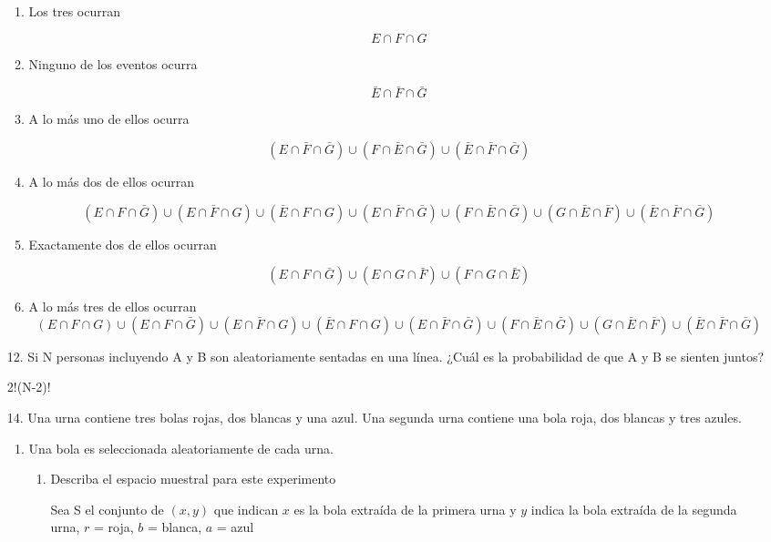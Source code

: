 \documentclass[letterpaper,11pt]{article}
\renewcommand{%
	\contentsname}{\vspace{-1cm} \hfill\bfseries\LARGE Índice \hfill \vspace{0.2cm}%
}
\begin{document}
\begin{enumerate}
\begin{enumerate}
	\item Los tres ocurran 
	
	$$ E \cap F \cap G $$

	\item Ninguno de los eventos ocurra 
	
	$$ \bar{E} \cap \bar{F} \cap \bar{G} $$

	\item A lo más uno de ellos ocurra 
	
	$$
	(E \cap \bar{F} \cap \bar{G}) \cup (F \cap \bar{E} \cap \bar{G}) \cup (\bar{E} \cap \bar{F} \cap \bar{G})
	$$

	\item A lo más dos de ellos ocurran 
	
	$$
	(E \cap F \cap \bar{G}) \cup (E \cap \bar{F} \cap G) \cup (\bar{E} \cap F \cap G) \cup (E \cap \bar{F} \cap \bar{G}) \cup (F \cap \bar{E} \cap \bar{G}) \cup (G \cap \bar{E} \cap \bar{F}) \cup (\bar{E} \cap \bar{F} \cap \bar{G})
	$$

	\item Exactamente dos de ellos ocurran 
	
	$$
	(E \cap F \cap \bar{G}) \cup (E \cap G \cap \bar{F}) \cup (F \cap G \cap \bar{E})
	$$

	\item A lo más tres de ellos ocurran 	
	$$
	(E \cap F \cap G) \cup (E \cap F \cap \bar{G}) \cup (E \cap \bar{F} \cap G) \cup (\bar{E} \cap F \cap G) \cup (E \cap \bar{F} \cap \bar{G}) \cup (F \cap \bar{E} \cap \bar{G}) \cup (G \cap \bar{E} \cap \bar{F}) \cup (\bar{E} \cap \bar{F} \cap \bar{G})
	$$
\end{enumerate}

\item[12.] Si N personas incluyendo A y B son aleatoriamente sentadas en una línea. ¿Cuál es la probabilidad de que A y B se sienten juntos?

2!(N-2)!

\item[14.] Una urna contiene tres bolas rojas, dos blancas y una azul. Una segunda urna contiene una bola roja, dos blancas y tres azules. 

\begin{enumerate}
	\item Una bola es seleccionada aleatoriamente de cada urna.
	\begin{enumerate}
		\item Describa el espacio muestral para este experimento
		
		Sea S el conjunto de $(x,y)$ que indican $x$ es la bola extraída de la primera urna y $y$ indica la bola extraída de la segunda urna, $r$ = roja, $b$ = blanca, $a$ = azul


\end{enumerate}
\end{enumerate}
\end{enumerate}
\end{document}
